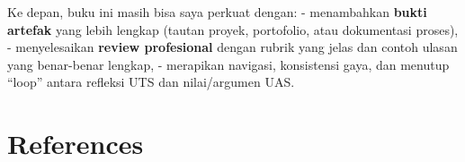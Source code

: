\documentclass[
  letterpaper,
  DIV=11,
  numbers=noendperiod]{scrreprt}
\begin{document}
Ke depan, buku ini masih bisa saya perkuat dengan: - menambahkan
\textbf{bukti artefak} yang lebih lengkap (tautan proyek, portofolio,
atau dokumentasi proses), - menyelesaikan \textbf{review profesional}
dengan rubrik yang jelas dan contoh ulasan yang benar-benar lengkap, -
merapikan navigasi, konsistensi gaya, dan menutup ``loop'' antara
refleksi UTS dan nilai/argumen UAS.


\chapter*{References}\label{references}


\label{refs}
\end{document}
